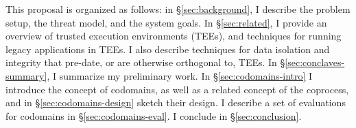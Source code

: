 This proposal is organized as follows: in \S\ref{sec:background}, I describe
the problem setup, the threat model, and the system goals.
%
In \S\ref{sec:related}, I provide an overview of trusted execution
environments (TEEs), and techniques for running legacy applications
in TEEs.
%
I also describe techniques for data isolation and integrity that pre-date, or
are otherwise orthogonal to, TEEs.
%
In \S\ref{sec:conclaves-summary}, I summarize my preliminary work.
%
In \S\ref{sec:codomains-intro} I introduce the concept of codomains, as well as
a related concept of the coprocess, and in \S\ref{sec:codomains-design} sketch
their design.
%
I describe a set of evaluations for codomains in \S\ref{sec:codomains-eval}.
%
I conclude in \S\ref{sec:conclusion}.
